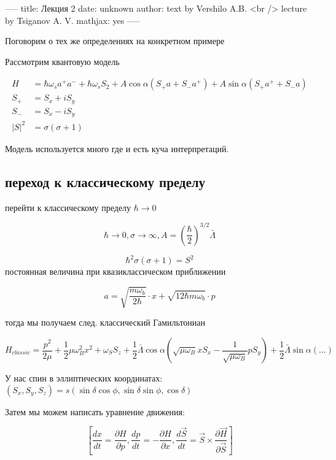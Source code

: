 -----
title: Лекция 2
date: unknown
author: text by Vershilo A.B. <br /> lecture by Tsiganov A. V.
mathjax: yes
-----

Поговорим о тех же определениях на конкретном примере

Рассмотрим квантовую модель 

\begin{equation}
  \begin{align}
      H &= \hbar  \omega_s a^+a^- + \hbar \omega_s S_2 
    + A \cos \alpha (S_+a +S_-a^+)
    + A \sin \alpha (S_+a^+ + S_-a) \\
    S_+ &= S_x+iS_y \\
    S_- &= S_x-iS_y \\
    |S|^2 &= \sigma(\sigma+1)
  \end{align}
\end{equation}

Модель используется много где и есть куча интерпретаций.

\subsection{переход к классическому пределу}
перейти к классическому пределу $\hbar \rightarrow 0$

\begin{equation}
  \hbar \rightarrow 0, \sigma \rightarrow \infty, A = \left(\frac{\hbar}{2}\right)^{3/2} \bar{\Lambda}
\end{equation}

$$ \hbar^2 \sigma(\sigma+1)= S^2$$
постоянная величина при квазиклассическом приближении

$$a=\sqrt{\frac{m\omega_b}{2\hbar}}\cdot x + \sqrt{{1}{2\hbar m\omega_b}}\cdot p$$

тогда мы получаем след. классический Гамильтониан

$$H_{classic} = \frac{p^2}{2\mu} + \frac{1}{2} \mu \omega_B^2x^2+\omega_SS_z
  +\frac{1}{2}\bar\Lambda\cos\alpha(\sqrt{\mu\omega_B}xS_x - \frac{1}{\sqrt{\mu\omega_B}}pS_y)
  +\frac{1}{2}\bar\Lambda\sin\alpha(\ldots)$$

У нас спин в эллиптических координатах: $(S_x,S_y,S_z) = s(\sin\delta\cos\phi,\sin\delta\sin\phi,\cos\delta)$

Затем мы можем написать уравнение движения:

$$ \left[ \frac{dx}{dt} = \frac{\partial H}{\partial p}
   , \frac{dp}{dt} = - \frac{\partial H}{\partial x}
   , \frac{d\vec S}{dt} = \vec{S} \times \frac{\partial\vec H}{\partial\vec S}
   \right] $$


